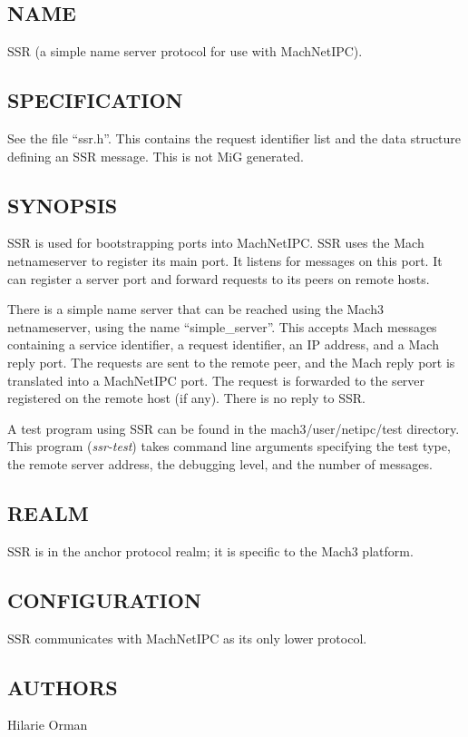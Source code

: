 %
%
%

\subsection*{NAME}

\noindent SSR (a simple name server protocol for use with MachNetIPC).

\subsection*{SPECIFICATION}

See the file ``ssr.h''.  This contains the request identifier list
and the data structure defining an SSR message.  This is not MiG generated.

\subsection*{SYNOPSIS}

\noindent SSR is used for bootstrapping ports into MachNetIPC.  SSR
uses the Mach netnameserver to register its main port.  It listens
for messages on this port.  It can register a server port and forward
requests to its peers on remote hosts.

There is a simple name server that can be
reached using the Mach3 netnameserver, using the name ``simple\_server''.
This accepts Mach messages containing a service identifier, a request
identifier, an IP address, and a Mach reply port.  The requests are sent 
to the remote peer, and the Mach reply port is translated into a MachNetIPC
port.  The request is forwarded to the server registered on the remote
host (if any).  There is no reply to SSR.  

A test program using SSR can be found in the mach3/user/netipc/test 
directory.  This program ({\em ssr-test}) takes command line arguments
specifying the test type, the remote server address, the debugging
level, and the number of messages.

\subsection*{REALM}

SSR is in the anchor protocol realm; it is specific to the Mach3 platform.

\subsection*{CONFIGURATION}

SSR communicates with MachNetIPC as its only lower protocol.


\subsection*{AUTHORS}

\noindent Hilarie Orman
